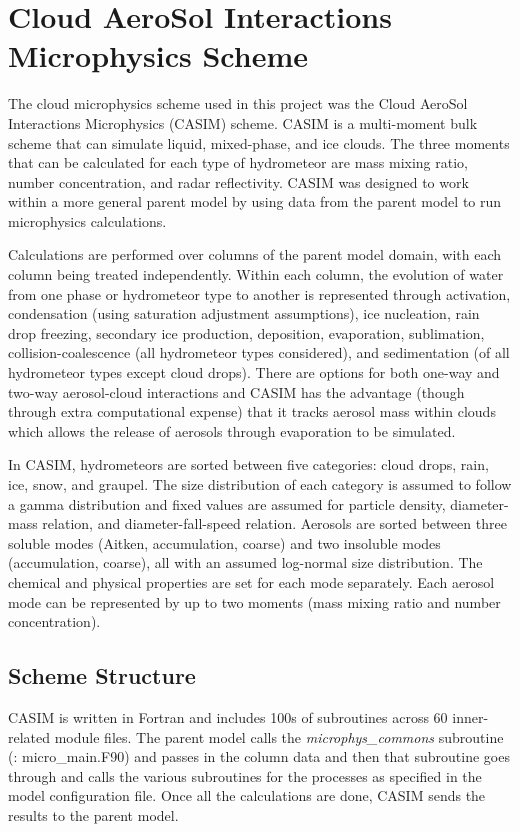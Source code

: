 \section{Cloud AeroSol Interactions Microphysics Scheme} \label{ch:casim}
The cloud microphysics scheme used in this project was the Cloud AeroSol Interactions Microphysics (CASIM) scheme. CASIM is a multi-moment bulk scheme that can simulate liquid, mixed-phase, and ice clouds. The three moments that can be calculated for each type of hydrometeor are mass mixing ratio, number concentration, and radar reflectivity. \citep{milt2018-1,casimCode} CASIM was designed to work within a more general parent model by using data from the parent model to run microphysics calculations. 

Calculations are performed over columns of the parent model domain, with each column being treated independently. Within each column, the evolution of water from one phase or hydrometeor type to another is represented through activation, condensation (using saturation adjustment assumptions), ice nucleation, rain drop freezing, secondary ice production, deposition, evaporation, sublimation, collision-coalescence (all hydrometeor types considered), and sedimentation (of all hydrometeor types except cloud drops). There are options for both one-way and two-way aerosol-cloud interactions and CASIM has the advantage (though through extra computational expense) that it tracks aerosol mass within clouds which allows the release of aerosols through evaporation to be simulated. \citep{milt2018-1, brown2017}

In CASIM, hydrometeors are sorted between five categories: cloud drops, rain, ice, snow, and graupel. The size distribution of each category is assumed to follow a gamma distribution and fixed values are assumed for particle density, diameter-mass relation, and diameter-fall-speed relation. Aerosols are sorted between three soluble modes (Aitken, accumulation, coarse) and two insoluble modes (accumulation, coarse), all with an assumed log-normal size distribution. The chemical and physical properties are set for each mode separately. Each aerosol mode can be represented by up to two moments (mass mixing ratio and number concentration). \citep{milt2018-1,casimCode}

\subsection{Scheme Structure}
CASIM is written in Fortran and includes 100s of subroutines across 60 inner-related module files. The parent model calls the \textit{microphys\_commons} subroutine (\cite{casimCode}: micro\_main.F90) and passes in the column data and then that subroutine goes through and calls the various subroutines for the processes as specified in the model configuration file. Once all the calculations are done, CASIM sends the results to the parent model. \citep{brown2017}
\newpage
